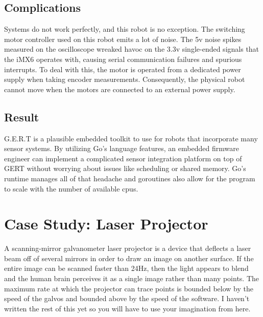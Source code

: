 \subsection{Complications}
Systems do not work perfectly, and this robot is no exception. The switching motor controller used
on this robot emits a lot of noise. The 5v noise spikes measured on the oscilloscope wreaked havoc
on the 3.3v single-ended signals that the iMX6 operates with, causing serial communication failures
and spurious interrupts. To deal with this, the motor is operated from a dedicated power supply
when taking encoder measurements. Consequently, the physical robot cannot move when the motors
are connected to an external power supply.

\subsection{Result}
G.E.R.T is a plausible embedded toolkit to use for robots that incorporate many sensor systems.
By utilizing Go's language features, an embedded firmware engineer can implement a complicated sensor integration
platform on top of GERT without worrying about issues like scheduling or shared memory. Go's runtime manages all
of that headache and goroutines also allow for the program to scale with the number of available cpus.


\section{Case Study: Laser Projector}\label{sec:laser}
A scanning-mirror galvanometer laser projector is a device that deflects a laser beam off of several mirrors in
order to draw an image on another surface. If the entire image can be scanned faster than 24Hz, then the light appears
to blend and the human brain perceives it as a single image rather than many points. The maximum rate at which the
projector can trace points is bounded below by the speed of the galvos and bounded above by the speed of the software.
I haven't written the rest of this yet so you will have to use your imagination from here.
